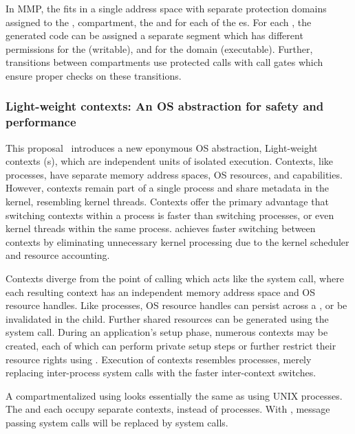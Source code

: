 In MMP, the \browser fits in a single address space with separate protection 
domains assigned to the \renderer, \local compartment, the \manager 
and for each of the \sandbox{}es.
For each \sandbox, the generated code can be assigned a separate segment
which has different permissions for the \renderer (writable), 
and for the \sandbox domain (executable).
Further, transitions between compartments use protected calls with 
call gates which ensure proper checks on these transitions.

\subsubsection{Light-weight contexts: An OS abstraction for safety and performance}
This proposal~\cite{LittonVE0BD16} introduces a new eponymous OS abstraction,
Light-weight contexts (\lwc{}s),
which are independent units of isolated execution.
Contexts, like processes, have separate memory address spaces, OS resources,
and capabilities.
However, contexts remain part of a single process and share metadata in the 
kernel, resembling kernel threads.
Contexts offer the primary advantage that switching contexts within a process is 
faster than switching processes, or even kernel threads within the same process.
\lwc achieves faster switching between contexts by eliminating unnecessary kernel
processing due to the kernel scheduler and resource accounting.

Contexts diverge from the point of calling  which acts like
the  system call, where each resulting context has an 
independent memory address space and OS resource handles.
Like processes, OS resource handles can persist across a , or be
invalidated in the child.
Further shared resources can be generated using the  system 
call.
During an application's setup phase, numerous contexts may be created, each of 
which can perform private setup steps or further restrict their resource rights 
using .
Execution of contexts resembles processes, merely replacing inter-process system
calls with the faster inter-context switches.

A \browser compartmentalized using \lwc looks essentially the same as
using UNIX processes. 
The \renderer and each \sandbox occupy separate contexts, instead of processes.
With \lwc, message passing system calls will be replaced by
 system calls.

